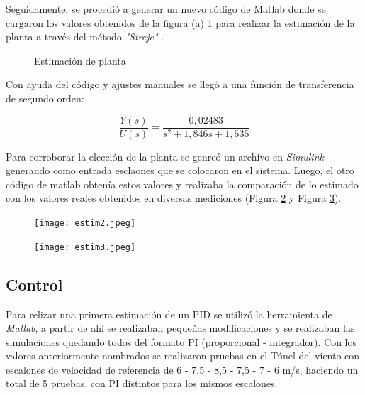     Seguidamente, se procedió a generar un nuevo código de Matlab donde se cargaron los valores obtenidos de la figura (a) \ref{fig:pl2} para realizar la estimación de la planta a través del método \textit{"Strejc"} \cite{pomares2011sistemas}.
    
    \begin{figure}[htbp]
    	\centering
    	\caption{Estimación de planta} \label{fig:pl2}
    \end{figure}
    
    Con ayuda del código y ajustes manuales se llegó a una función de transferencia de segundo orden:
    
    \begin{equation}
    	\frac{Y(s)}{U(s)}=\frac{0,02483}{s^2+1,846s+1,535}
    \end{equation}
    
    Para corroborar la elección de la planta se genreó un archivo en \textit{Simulink} generando como entrada esclaones que se colocaron en el sistema. Luego, el otro código de matlab obtenía estos valores y realizaba la comparación de lo estimado con los valores reales obtenidos en diversas mediciones (Figura \ref{fig:estim2} y Figura \ref{fig:estim3}).
    
    \begin{figure}[htb]
    	\centering
    	\texttt{[image: estim2.jpeg]}
    	\label{fig:estim2}
    \end{figure}

\begin{figure}[htb]
	\centering
	\texttt{[image: estim3.jpeg]}
	\label{fig:estim3}
\end{figure}
    
       
    \subsection{Control}
    Para relizar una primera estimación de un PID se utilizó la herramienta de \textit{Matlab}, a partir de ahí se realizaban pequeñas modificaciones y se realizaban las simulaciones quedando todos del formato PI (proporcional - integrador).
    Con los valores anteriormente nombrados se realizaron pruebas en el Túnel del viento con escalones de velocidad de referencia de 6 - 7,5 - 8,5 - 7,5 - 7 - 6 m/s, haciendo un total de 5 pruebas, con PI distintos para los mismos escalones. 
    
